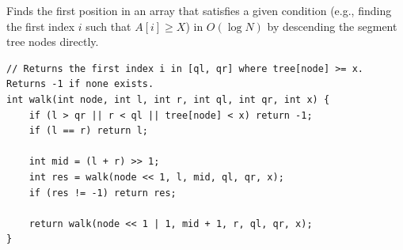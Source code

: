 
Finds the first position in an array that satisfies a given condition (e.g., finding the first index $i$ such that $A[i] \ge X$) in $O(\log N)$ by descending the segment tree nodes directly.

\begin{lstlisting}
// Returns the first index i in [ql, qr] where tree[node] >= x. Returns -1 if none exists.
int walk(int node, int l, int r, int ql, int qr, int x) {
    if (l > qr || r < ql || tree[node] < x) return -1;
    if (l == r) return l;
    
    int mid = (l + r) >> 1;
    int res = walk(node << 1, l, mid, ql, qr, x);
    if (res != -1) return res;
    
    return walk(node << 1 | 1, mid + 1, r, ql, qr, x);
}
\end{lstlisting}
